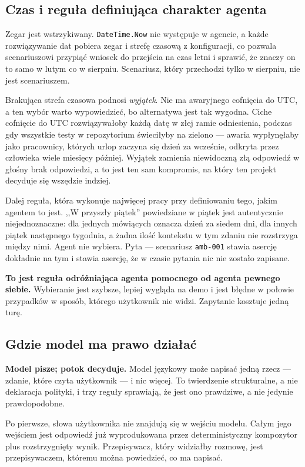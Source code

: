 \documentclass[11pt,a4paper]{article}
\newcommand{\finding}[1]{{\color{primaryblue}\textbf{#1}}}
\begin{document}
\subsection{Czas i reguła definiująca charakter agenta}

Zegar jest wstrzykiwany. \texttt{DateTime.Now} nie występuje w agencie, a każde rozwiązywanie dat pobiera zegar i strefę czasową z konfiguracji, co pozwala scenariuszowi przypiąć wniosek do przejścia na czas letni i sprawić, że znaczy on to samo w lutym co w sierpniu. Scenariusz, który przechodzi tylko w sierpniu, nie jest scenariuszem.

Brakująca strefa czasowa podnosi \emph{wyjątek}. Nie ma awaryjnego cofnięcia do UTC, a ten wybór warto wypowiedzieć, bo alternatywa jest tak wygodna. Ciche cofnięcie do UTC rozwiązywałoby każdą datę w złej ramie odniesienia, podczas gdy wszystkie testy w repozytorium świeciłyby na zielono --- awaria wypłynęłaby jako pracownicy, których urlop zaczyna się dzień za wcześnie, odkryta przez człowieka wiele miesięcy później. Wyjątek zamienia niewidoczną złą odpowiedź w głośny brak odpowiedzi, a to jest ten sam kompromis, na który ten projekt decyduje się wszędzie indziej.

Dalej reguła, która wykonuje najwięcej pracy przy definiowaniu tego, jakim agentem to jest. ,,W przyszły piątek'' powiedziane w piątek jest autentycznie niejednoznaczne: dla jednych mówiących oznacza dzień za siedem dni, dla innych piątek następnego tygodnia, a żadna ilość kontekstu w tym zdaniu nie rozstrzyga między nimi. Agent nie wybiera. Pyta --- scenariusz \texttt{amb-001} stawia asercję dokładnie na tym i stawia asercję, że w czasie pytania nic nie zostało zapisane.

\finding{To jest reguła odróżniająca agenta pomocnego od agenta pewnego siebie.} Wybieranie jest szybsze, lepiej wygląda na demo i jest błędne w połowie przypadków w sposób, którego użytkownik nie widzi. Zapytanie kosztuje jedną turę.

\subsection{Gdzie model ma prawo działać}

\finding{Model pisze; potok decyduje.} Model językowy może napisać jedną rzecz --- zdanie, które czyta użytkownik --- i nic więcej. To twierdzenie strukturalne, a nie deklaracja polityki, i trzy reguły sprawiają, że jest ono prawdziwe, a nie jedynie prawdopodobne.

Po pierwsze, słowa użytkownika nie znajdują się w wejściu modelu. Całym jego wejściem jest odpowiedź już wyprodukowana przez deterministyczny kompozytor plus rozstrzygnięty wynik. Przepisywacz, który widziałby rozmowę, jest przepisywaczem, któremu można powiedzieć, co ma napisać.
\end{document}
